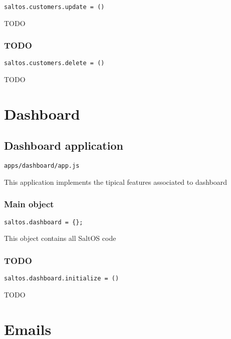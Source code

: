 \documentclass[a4paper]{book}
\begin{document}
\begin{lstlisting}
saltos.customers.update = ()
\end{lstlisting}

TODO

\hypertarget{toc515}{}
\subsection{TODO}

\begin{lstlisting}
saltos.customers.delete = ()
\end{lstlisting}

TODO


\hypertarget{toc516}{}
\chapter{Dashboard}

\hypertarget{toc517}{}
\section{Dashboard application}

\begin{lstlisting}
apps/dashboard/app.js
\end{lstlisting}

This application implements the tipical features associated to dashboard

\hypertarget{toc518}{}
\subsection{Main object}

\begin{lstlisting}
saltos.dashboard = {};
\end{lstlisting}

This object contains all SaltOS code

\hypertarget{toc519}{}
\subsection{TODO}

\begin{lstlisting}
saltos.dashboard.initialize = ()
\end{lstlisting}

TODO


\hypertarget{toc520}{}
\chapter{Emails}
\end{document}
